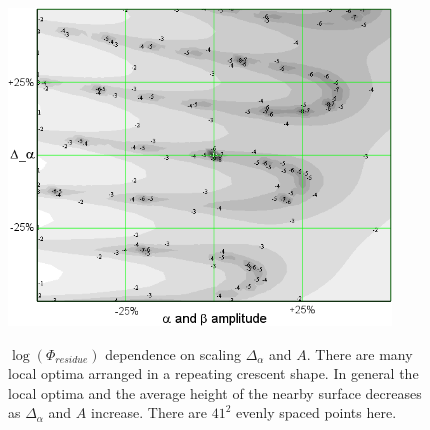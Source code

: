 \begin{figure}
\centering
\includegraphics[width=4.00in]
{delay_amp/delay_amp.png}\\
\caption[$\log\left(\Phi_{residue}\right)$ dependence on scaling $\Delta_{\alpha}$ and $A$]{$\log\left(\Phi_{residue}\right)$ dependence on scaling $\Delta_{\alpha}$ and $A$. There are many local optima arranged in a repeating crescent shape. In general the local optima and the average height of the nearby surface decreases as $\Delta_{\alpha}$ and $A$ increase. There are $41^2$ evenly spaced points here.}
\label{delay amp}
\end{figure} 
